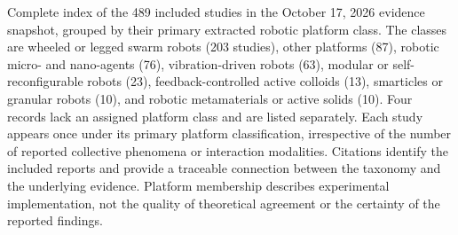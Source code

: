 Complete index of the 489 included studies in the October 17, 2026 evidence snapshot, grouped by their primary extracted robotic platform class. The classes are wheeled or legged swarm robots (203 studies), other platforms (87), robotic micro- and nano-agents (76), vibration-driven robots (63), modular or self-reconfigurable robots (23), feedback-controlled active colloids (13), smarticles or granular robots (10), and robotic metamaterials or active solids (10). Four records lack an assigned platform class and are listed separately. Each study appears once under its primary platform classification, irrespective of the number of reported collective phenomena or interaction modalities. Citations identify the included reports and provide a traceable connection between the taxonomy and the underlying evidence. Platform membership describes experimental implementation, not the quality of theoretical agreement or the certainty of the reported findings.